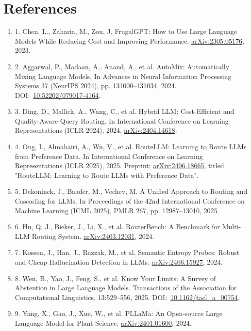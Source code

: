 \documentclass[10pt,a4paper]{article}
\begin{document}
\section*{References}
\begingroup\sloppy\small \begin{enumerate}[label={},leftmargin=0.9cm,itemindent=-0.9cm,itemsep=0pt,parsep=0pt,topsep=2pt]
\item 1. Chen, L., Zaharia, M., Zou, J. FrugalGPT: How to Use Large Language Models While Reducing Cost and Improving Performance. \href{https://arxiv.org/abs/2305.05176}{arXiv:2305.05176}, 2023.
\item 2. Aggarwal, P., Madaan, A., Anand, A., et al. AutoMix: Automatically Mixing Language Models. In Advances in Neural Information Processing Systems 37 (NeurIPS 2024), pp. 131000–131034, 2024. DOI:~\href{https://doi.org/10.52202/079017-4164}{10.52202/079017-4164}.
\item 3. Ding, D., Mallick, A., Wang, C., et al. Hybrid LLM: Cost-Efficient and Quality-Aware Query Routing. In International Conference on Learning Representations (ICLR 2024), 2024. \href{https://arxiv.org/abs/2404.14618}{arXiv:2404.14618}.
\item 4. Ong, I., Almahairi, A., Wu, V., et al. RouteLLM: Learning to Route LLMs from Preference Data. In International Conference on Learning Representations (ICLR 2025), 2025. Preprint: \href{https://arxiv.org/abs/2406.18665}{arXiv:2406.18665}, titled "RouteLLM: Learning to Route LLMs with Preference Data".
\item 5. Dekoninck, J., Baader, M., Vechev, M. A Unified Approach to Routing and Cascading for LLMs. In Proceedings of the 42nd International Conference on Machine Learning (ICML 2025), PMLR 267, pp. 12987–13010, 2025.
\item 6. Hu, Q. J., Bieker, J., Li, X., et al. RouterBench: A Benchmark for Multi-LLM Routing System. \href{https://arxiv.org/abs/2403.12031}{arXiv:2403.12031}, 2024.
\item 7. Kossen, J., Han, J., Razzak, M., et al. Semantic Entropy Probes: Robust and Cheap Hallucination Detection in LLMs. \href{https://arxiv.org/abs/2406.15927}{arXiv:2406.15927}, 2024.
\item 8. Wen, B., Yao, J., Feng, S., et al. Know Your Limits: A Survey of Abstention in Large Language Models. Transactions of the Association for Computational Linguistics, 13:529–556, 2025. DOI:~\href{https://doi.org/10.1162/tacl_a_00754}{10.1162/tacl\_a\_00754}.
\item 9. Yang, X., Gao, J., Xue, W., et al. PLLaMa: An Open-source Large Language Model for Plant Science. \href{https://arxiv.org/abs/2401.01600}{arXiv:2401.01600}, 2024.

\end{enumerate}
\end{document}
